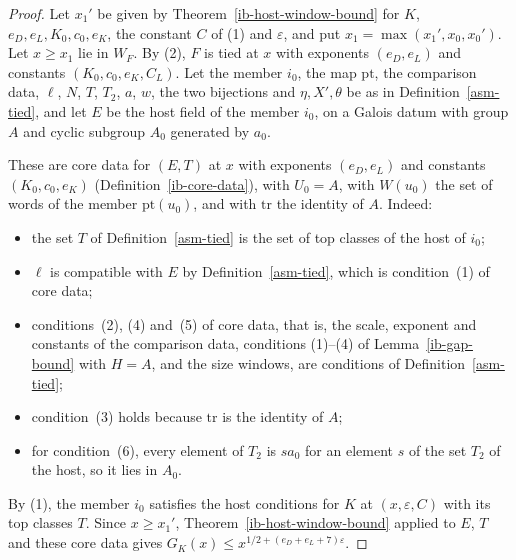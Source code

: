\begin{proof}
Let $x_1'$ be given by Theorem~\ref{ib-host-window-bound} for $K$,
$e_D,e_L,K_0,c_0,e_K$, the constant $C$ of (1) and $\varepsilon$, and put
$x_1=\max(x_1',x_0,x_0')$. Let $x\geq x_1$ lie in $W_F$. By (2), $F$ is tied at
$x$ with exponents $(e_D,e_L)$ and constants $(K_0,c_0,e_K,C_L)$. Let the member
$i_0$, the map $\mathrm{pt}$, the comparison data, $\ell$, $N$, $T$, $T_2$, $a$,
$w$, the two bijections and $\eta,X',\theta$ be as in Definition~\ref{asm-tied},
and let $E$ be the host field of the member $i_0$, on a Galois datum with group
$A$ and cyclic subgroup $A_0$ generated by $a_0$.

These are core data for $(E,T)$ at $x$ with exponents $(e_D,e_L)$ and constants
$(K_0,c_0,e_K)$ (Definition~\ref{ib-core-data}), with $U_0=A$, with $W(u_0)$ the
set of words of the member $\mathrm{pt}(u_0)$, and with $\mathrm{tr}$ the identity
of $A$. Indeed:
\begin{itemize}
\item the set $T$ of Definition~\ref{asm-tied} is the set of top classes of the
  host of $i_0$;
\item $\ell$ is compatible with $E$ by Definition~\ref{asm-tied}, which is
  condition~(1) of core data;
\item conditions~(2), (4) and~(5) of core data, that is, the scale, exponent and
  constants of the comparison data, conditions (1)--(4) of
  Lemma~\ref{ib-gap-bound} with $H=A$, and the size windows, are conditions of
  Definition~\ref{asm-tied};
\item condition~(3) holds because $\mathrm{tr}$ is the identity of $A$;
\item for condition~(6), every element of $T_2$ is $sa_0$ for an element $s$ of
  the set $T_2$ of the host, so it lies in $A_0$.
\end{itemize}
By (1), the member $i_0$ satisfies the host conditions for $K$ at
$(x,\varepsilon,C)$ with its top classes $T$. Since $x\geq x_1'$,
Theorem~\ref{ib-host-window-bound} applied to $E$, $T$ and these core data gives
$G_K(x)\leq x^{1/2+(e_D+e_L+7)\varepsilon}$.
\end{proof}
